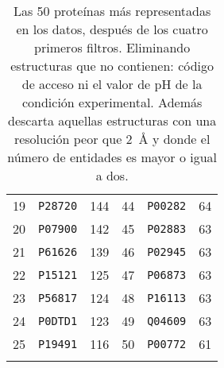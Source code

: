 \begin{table}[h]
\begin{tabular}{@{}llllll@{}}
19     & \texttt{P28720} & 144    & 44     & \texttt{P00282}     & 64   \\
20     & \texttt{P07900} & 142    & 45     & \texttt{P02883}     & 63   \\
21     & \texttt{P61626} & 139    & 46     & \texttt{P02945}     & 63   \\
22     & \texttt{P15121} & 125    & 47     & \texttt{P06873}     & 63   \\
23     & \texttt{P56817} & 124    & 48     & \texttt{P16113}     & 63   \\
24     & \texttt{P0DTD1} & 123    & 49     & \texttt{Q04609}     & 63   \\
25     & \texttt{P19491} & 116    & 50     & \texttt{P00772}     & 61   \\ \bottomrule
	\caption[Las 50 proteínas más representadas]{Las 50 proteínas más representadas en los datos, después de los cuatro primeros filtros. Eliminando estructuras que no contienen: código de acceso ni el valor de pH de la condición experimental. Además descarta aquellas estructuras con una resolución peor que \SI{2}{\angstrom} y donde el número de entidades es mayor o igual a dos.}
	\labtab{tab:top50}
	\end{tabular}
\end{table}

